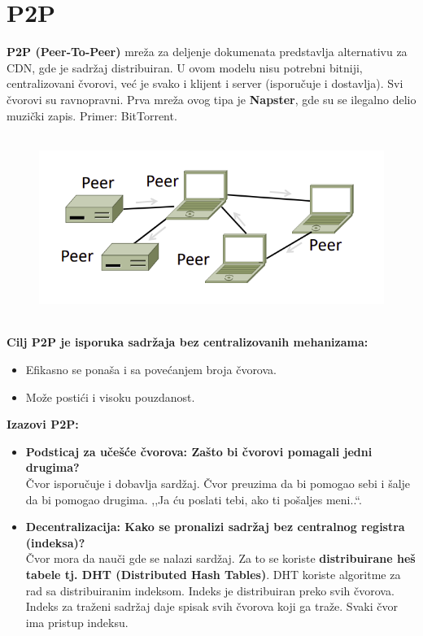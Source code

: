 \documentclass[a4paper]{article}
\begin{document}
\section{P2P}
    \textbf{P2P (Peer-To-Peer)} mreža za deljenje dokumenata predstavlja alternativu za CDN,
    gde je sadržaj distribuiran. U ovom modelu nisu potrebni bitniji, centralizovani čvorovi,
    već je svako i klijent i server (isporučuje i dostavlja). Svi čvorovi su ravnopravni.
    Prva mreža ovog tipa je \textbf{Napster}, gde su se ilegalno delio muzički zapis. 
    Primer: BitTorrent.
    \begin{figure}[H]
        \begin{center}
            \includegraphics[width=120mm,height=60mm]{Slike/p2p1.png}
        \end{center}
    \end{figure}
    \noindent \textbf{Cilj P2P je isporuka sadržaja bez centralizovanih mehanizama:}
    \begin{itemize}
        \item Efikasno se ponaša i sa povećanjem broja čvorova.
        \item Može postići i visoku pouzdanost.
    \end{itemize}
    \textbf{Izazovi P2P:}
    \begin{itemize}
        \item \textbf{Podsticaj za učešće čvorova: Zašto bi čvorovi pomagali jedni drugima?}\\
              Čvor isporučuje i dobavlja sardžaj. Čvor preuzima da bi pomogao sebi i šalje
              da bi pomogao drugima. ,,Ja ću poslati tebi, ako ti pošaljes meni..``.
        \item \textbf{Decentralizacija: Kako se pronalizi sadržaj bez centralnog registra (indeksa)?}\\
              Čvor mora da nauči gde se nalazi sardžaj. Za to se koriste \textbf{distribuirane heš
              tabele tj. DHT (Distributed Hash Tables)}. DHT koriste algoritme za rad sa distribuiranim
              indeksom. Indeks je distribuiran preko svih čvorova. Indeks za traženi sadržaj daje
              spisak svih čvorova koji ga traže. Svaki čvor ima pristup indeksu.
    \end{itemize}
\end{document}
